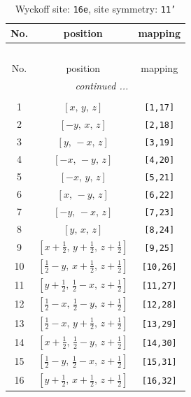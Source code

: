 \documentclass[fleqn,8pt]{jsarticle}
\begin{document}
\begin{longtable}{ccc}
\caption{Wyckoff site: {\tt 16e}, site symmetry: {\tt 11'}}
 \\
 \hline \hline
No. & position & mapping \\ \hline \endfirsthead

\multicolumn{2}{l}{\tablename\ \thetable{}} \\
 \hline \hline
No. & position & mapping \\ \hline \endhead

 \hline \hline
\multicolumn{2}{r}{\footnotesize\it continued ...} \\ \endfoot

 \hline \hline
\multicolumn{2}{r}{} \\ \endlastfoot

1 & $\left[ x,\, y,\, z \right]$ & {\tt [1,17]} \\ \hline
2 & $\left[ - y,\, x,\, z \right]$ & {\tt [2,18]} \\ \hline
3 & $\left[ y,\, - x,\, z \right]$ & {\tt [3,19]} \\ \hline
4 & $\left[ - x,\, - y,\, z \right]$ & {\tt [4,20]} \\ \hline
5 & $\left[ - x,\, y,\, z \right]$ & {\tt [5,21]} \\ \hline
6 & $\left[ x,\, - y,\, z \right]$ & {\tt [6,22]} \\ \hline
7 & $\left[ - y,\, - x,\, z \right]$ & {\tt [7,23]} \\ \hline
8 & $\left[ y,\, x,\, z \right]$ & {\tt [8,24]} \\ \hline
9 & $\left[ x + \frac{1}{2},\, y + \frac{1}{2},\, z + \frac{1}{2} \right]$ & {\tt [9,25]} \\ \hline
10 & $\left[ \frac{1}{2} - y,\, x + \frac{1}{2},\, z + \frac{1}{2} \right]$ & {\tt [10,26]} \\ \hline
11 & $\left[ y + \frac{1}{2},\, \frac{1}{2} - x,\, z + \frac{1}{2} \right]$ & {\tt [11,27]} \\ \hline
12 & $\left[ \frac{1}{2} - x,\, \frac{1}{2} - y,\, z + \frac{1}{2} \right]$ & {\tt [12,28]} \\ \hline
13 & $\left[ \frac{1}{2} - x,\, y + \frac{1}{2},\, z + \frac{1}{2} \right]$ & {\tt [13,29]} \\ \hline
14 & $\left[ x + \frac{1}{2},\, \frac{1}{2} - y,\, z + \frac{1}{2} \right]$ & {\tt [14,30]} \\ \hline
15 & $\left[ \frac{1}{2} - y,\, \frac{1}{2} - x,\, z + \frac{1}{2} \right]$ & {\tt [15,31]} \\ \hline
16 & $\left[ y + \frac{1}{2},\, x + \frac{1}{2},\, z + \frac{1}{2} \right]$ & {\tt [16,32]} \\
\end{longtable}
\end{document}
